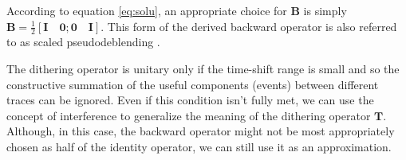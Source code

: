 According to equation \ref{eq:solu}, an appropriate choice for $\mathbf{B}$ is simply 
$\mathbf{B}=\frac{1}{2}[\mathbf{I}\quad\mathbf{0};\mathbf{0}\quad\mathbf{I}]$. This form of the derived backward operator is also referred to as scaled pseudodeblending \cite[]{arazthesis}.

The dithering operator is unitary only if the time-shift range is small and so the constructive summation of the useful components (events) between different traces can be ignored. Even if this condition isn't fully met, we can use the concept of interference to generalize the meaning of the dithering operator $\mathbf{T}$. Although, in this case, the backward operator might not be most appropriately chosen as half of the identity operator, we can still use it as an approximation.

